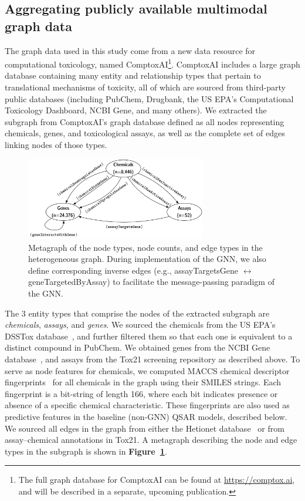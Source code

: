 \documentclass{ws-procs11x85}
\begin{document}
\subsection{Aggregating publicly available multimodal graph data}
The graph data used in this study come from a new data resource for computational toxicology, named ComptoxAI\footnote{The full graph database for ComptoxAI can be found at \url{https://comptox.ai}, and will be described in a separate, upcoming publication.}.
ComptoxAI includes a large graph database containing many entity and relationship types that pertain to translational mechanisms of toxicity, all of which are sourced from third-party public databases (including PubChem, Drugbank, the US EPA's Computational Toxicology Dashboard, NCBI Gene, and many others).
We extracted the subgraph from ComptoxAI's graph database defined as all nodes representing chemicals, genes, and toxicological assays, as well as the complete set of edges linking nodes of those types.

\begin{figure}
   \centering
   \includegraphics[width=0.7\textwidth]{figures/figure1-1.pdf}
   \caption{Metagraph of the node types, node counts, and edge types in the heterogeneous graph. During implementation of the GNN, we also define corresponding inverse edges (e.g., assayTargetsGene $\leftrightarrow$ geneTargetedByAssay) to facilitate the message-passing paradigm of the GNN.}\label{fig:2}
\end{figure}

The 3 entity types that comprise the nodes of the extracted subgraph are \textit{chemicals}, \textit{assays}, and \textit{genes}.
We sourced the chemicals from the US EPA's DSSTox database~\cite{williams2017comptox}, and further filtered them so that each one is equivalent to a distinct compound in PubChem.
We obtained genes from the NCBI Gene database~\cite{brown2015gene}, and assays from the Tox21 screening repository as described above.
To serve as node features for chemicals, we computed MACCS chemical descriptor fingerprints~\cite{durant2002reoptimization} for all chemicals in the graph using their SMILES strings.
Each fingerprint is a bit-string of length 166, where each bit indicates presence or absence of a specific chemical characteristic.
These fingerprints are also used as predictive features in the baseline (non-GNN) QSAR models, described below.
We sourced all edges in the graph from either the Hetionet database~\cite{himmelstein2017systematic} or from assay--chemical annotations in Tox21.
A metagraph describing the node and edge types in the subgraph is shown in \textbf{Figure~\ref{fig:2}}.
\end{document}
